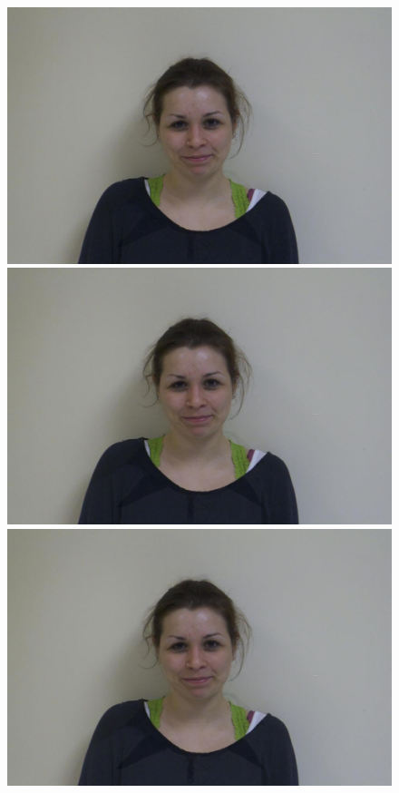 \documentclass[11pt]{article}
\begin{document}
\begin{figure}[H]
\begin{center}
\includegraphics[scale=0.06]{figs/frames/morph_steinkirch_tangatur_04.jpg} 
\includegraphics[scale=0.06]{figs/frames/morph_steinkirch_tangatur_05.jpg} 
\includegraphics[scale=0.06]{figs/frames/morph_steinkirch_tangatur_06.jpg} 

\end{center}
\end{figure}
\end{document}
